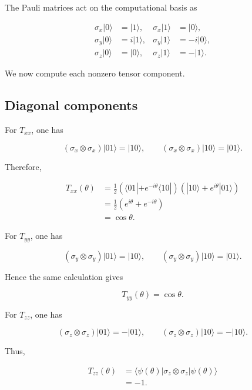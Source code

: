 The Pauli matrices act on the computational basis as

\begin{align}
\sigma_x |0\rangle &= |1\rangle,
&
\sigma_x |1\rangle &= |0\rangle,
\nonumber
\\
\sigma_y |0\rangle &= i|1\rangle,
&
\sigma_y |1\rangle &= -i|0\rangle,
\nonumber
\\
\sigma_z |0\rangle &= |0\rangle,
&
\sigma_z |1\rangle &= -|1\rangle.
\label{eq:der_pauli_basis_action}
\end{align}

\medskip

We now compute each nonzero tensor component.

\subsection*{Diagonal components}

For \( T_{xx} \), one has

\[
(\sigma_x \otimes \sigma_x)|01\rangle = |10\rangle,
\qquad
(\sigma_x \otimes \sigma_x)|10\rangle = |01\rangle.
\]

Therefore,

\begin{align}
T_{xx}(\theta)
&=
\frac{1}{2}
\left(
\langle 01|
+
e^{-i\theta}\langle 10|
\right)
\left(
|10\rangle
+
e^{i\theta}|01\rangle
\right)
\nonumber
\\
&=
\frac{1}{2}
\left(
e^{i\theta}
+
e^{-i\theta}
\right)
\nonumber
\\
&=
\cos\theta.
\label{eq:der_Txx_phase_model}
\end{align}

For \( T_{yy} \), one has

\[
(\sigma_y \otimes \sigma_y)|01\rangle = |10\rangle,
\qquad
(\sigma_y \otimes \sigma_y)|10\rangle = |01\rangle.
\]

Hence the same calculation gives

\begin{equation}
T_{yy}(\theta)
=
\cos\theta.
\label{eq:der_Tyy_phase_model}
\end{equation}

For \( T_{zz} \), one has

\[
(\sigma_z \otimes \sigma_z)|01\rangle = -|01\rangle,
\qquad
(\sigma_z \otimes \sigma_z)|10\rangle = -|10\rangle.
\]

Thus,

\begin{align}
T_{zz}(\theta)
&=
\langle \psi(\theta) |
\sigma_z \otimes \sigma_z
|
\psi(\theta)
\rangle
\nonumber
\\
&=
-1.
\label{eq:der_Tzz_phase_model}
\end{align}

